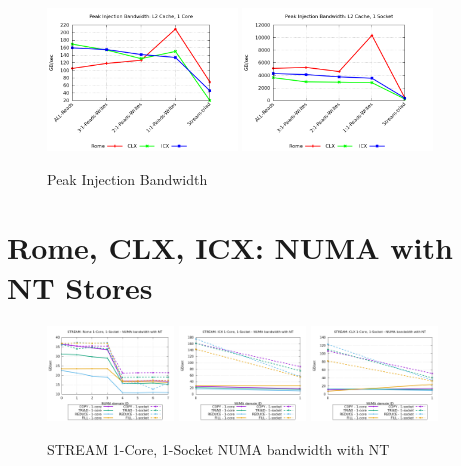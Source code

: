 \documentclass{article}
\begin{document}
\begin{figure}[!hb]
    \centering
    \includegraphics[width=0.45\textwidth]{../data/mlc/bw_1c_l2}
    \includegraphics[width=0.45\textwidth]{../data/mlc/bw_1s_l2}
    \caption{Peak Injection Bandwidth}
    \label{figure:mlc_bw}
\end{figure}


\clearpage



\appendix
\appendixpage
\addappheadtotoc

\section{Rome, CLX, ICX: NUMA with NT Stores}
\begin{figure}[!ht]
    \centering
    \includegraphics[width=0.3\textwidth]{../data/rome-clx-icx/mem_bw_numa/Rome_numa_nps4_compact_nt}
    \includegraphics[width=0.3\textwidth]{../data/rome-clx-icx/mem_bw_numa/ICX_numa_nps1_compact_nt}
    \includegraphics[width=0.3\textwidth]{../data/rome-clx-icx/mem_bw_numa/CLX_numa_nps1_compact_nt}
    \caption{STREAM 1-Core, 1-Socket NUMA bandwidth with NT}
    \label{figure:mem_bw_numa_nt}
\end{figure}
\end{document}
